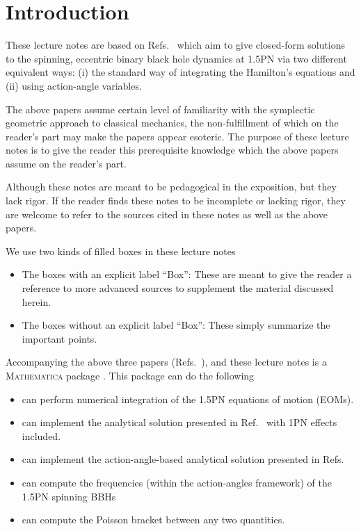 \chapter{Introduction}



These lecture notes are based on Refs.~\cite{tanay2021action, tanay2021integrability, Cho:2019brd}
 which aim to give closed-form solutions to the spinning, eccentric
binary black hole dynamics at 1.5PN via two different equivalent ways: (i)
the standard way of integrating the Hamilton's equations and (ii) using action-angle variables.



The above papers assume certain level of familiarity
with the symplectic geometric approach to classical mechanics, the non-fulfillment
of which on the reader's part may make the papers appear esoteric.
The purpose of these lecture notes is to give the reader this prerequisite
 knowledge which the above papers assume on the reader's part. 

Although these notes are meant to be pedagogical 
in the exposition, but they
lack rigor. If the reader 
finds these notes to be incomplete or lacking rigor, they are welcome to
refer to the sources cited in these notes as well as the above papers.



We use two kinds of filled boxes in these lecture notes
\begin{itemize}
\item The boxes with an explicit label ``Box'': These are meant
to give the reader a reference to more advanced sources to supplement
the material discussed herein. 
\item The boxes without an explicit label ``Box'': These simply 
summarize the important points.
\end{itemize}


Accompanying the above three papers (Refs.~\cite{tanay2021action, tanay2021integrability, Cho:2019brd}), and these lecture notes
is a \textsc{Mathematica} package \cite{MMA1}. This package can 
do the following
\begin{itemize}
\item can perform numerical integration of the 1.5PN equations of motion (EOMs).
\item can implement the analytical solution presented in Ref.~\cite{Cho:2019brd} with
1PN effects included.
\item can implement the action-angle-based analytical solution presented in
Refs.~\cite{tanay2021action, tanay2021integrability}
\item can compute the frequencies (within the action-angles framework) 
of the 1.5PN spinning BBHs
\item can compute the Poisson bracket between any two quantities.
\end{itemize}














